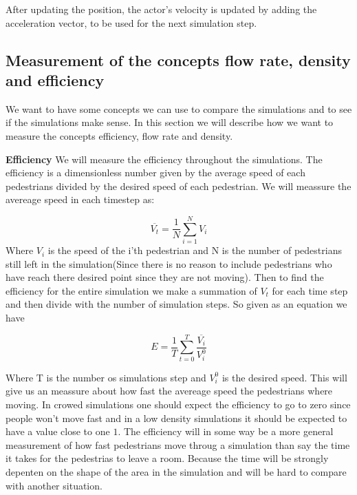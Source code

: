 After updating the position, the actor's velocity is updated by adding the 
acceleration vector, to be used for the next simulation step.

%
%
%
%
%
%
%

\subsection{Measurement of the concepts flow rate, density and efficiency}
We want to have some concepts we can use to compare the simulations and to see 
if the simulations make sense.  In this section we will describe how we want 
to measure the concepts efficiency, flow rate and density.

\textbf{Efficiency}
We will measure the efficiency throughout the simulations. The efficiency is a 
dimensionless number given by the average speed of each pedestrians divided by 
the desired speed of each pedestrian. We will meassure the avereage speed in each 
timestep as:

\begin{equation}
	\overline{V_t}=\frac{1}{N}\sum_{i=1}^{N}V_i
\end{equation}
Where $V_i$ is the speed of the i'th pedestrian and N is the number of pedestrians 
still left in the simulation(Since there is no reason to include pedestrians who have 
reach there desired point since they are not moving). Then to find the efficiency for 
the entire simulation we make a summation of $V_t$ for each time step and then divide 
with the number of simulation steps. So given as an equation we have

\begin{equation}
		E=\frac{1}{T}\sum_{t=0}^{T}\frac{\overline{V_i}}{V^0_{i}}
\end{equation}

Where T is the number os simulations step and $V^0_{i}$ is the desired speed. This will 
give us an meassure about how fast the avereage speed the pedestrians where moving. In 
crowed simulations one should expect the efficiency to go to zero since people won't move 
fast and in a low density simulations it should be expected to have a value close to one $1$. 
The efficiency will in some way be a more general measurement of how fast pedestrians move 
throug a simulation than say the time it takes for the pedestrias to leave a room. Because 
the time will be strongly depenten on the shape of the area in the simulation and will be 
hard to compare with another situation. 
	
